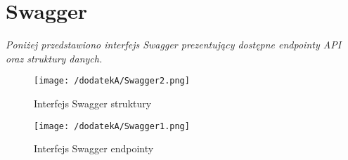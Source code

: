 %

\chapter{Swagger}
\label{chapter:dodatek_A}

\textit{Poniżej przedstawiono interfejs Swagger prezentujący dostępne endpointy API oraz struktury danych.}

\begin{figure}[!htb]
	\centering
	\texttt{[image: /dodatekA/Swagger2.png]}
	\caption{Interfejs Swagger struktury}
	\label{fig:swagger2}
\end{figure}

\begin{figure}[!htb]
	\centering
	\texttt{[image: /dodatekA/Swagger1.png]}
	\caption{Interfejs Swagger endpointy}
	\label{fig:swagger1}
\end{figure}